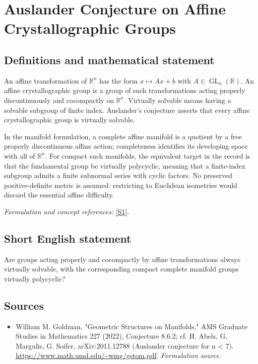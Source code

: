 \documentclass[11pt]{article}
\begin{document}
\section*{\texorpdfstring{Auslander Conjecture on Affine Crystallographic Groups}{Auslander Conjecture on Affine Crystallographic Groups}}\label{472}
\subsection{Definitions and mathematical statement}
An affine transformation of ${\mathbb{R}}^n$ has the form $x\mapsto Ax+b$ with $A\in\operatorname{GL}_n({\mathbb{R}})$. An affine crystallographic group is a group of such transformations acting properly discontinuously and cocompactly on ${\mathbb{R}}^n$. Virtually solvable means having a solvable subgroup of finite index. Auslander's conjecture asserts that every affine crystallographic group is virtually solvable.

In the manifold formulation, a complete affine manifold is a quotient by a free properly discontinuous affine action; completeness identifies its developing space with all of ${\mathbb{R}}^n$. For compact such manifolds, the equivalent target in the record is that the fundamental group be virtually polycyclic, meaning that a finite-index subgroup admits a finite subnormal series with cyclic factors. No preserved positive-definite metric is assumed: restricting to Euclidean isometries would discard the essential affine difficulty.
\par\smallskip\textit{Formulation and concept references:} \href{https://www.math.umd.edu/~wmg/gstom.pdf}{[S1]}.

\subsection{Short English statement}
Are groups acting properly and cocompactly by affine transformations always virtually solvable, with the corresponding compact complete manifold groups virtually polycyclic?
\subsection{Sources}
\begin{itemize}
\item[S1]William M. Goldman, "Geometric Structures on Manifolds," AMS Graduate Studies in Mathematics 227 (2022), Conjecture 8.6.2; cf. H. Abels, G. Margulis, G. Soifer, arXiv:2011.12788 (Auslander conjecture for n < 7).
\url{https://www.math.umd.edu/~wmg/gstom.pdf}.
\textit{Formulation source.}
\end{itemize}
\end{document}
